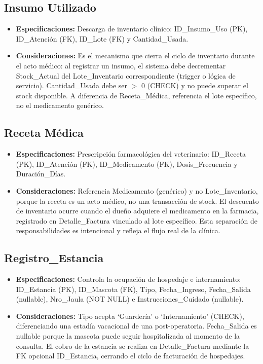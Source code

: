 \subsection{Insumo Utilizado}

\begin{itemize}
	\item \textbf{Especificaciones:} Descarga de inventario clínico: ID\_Insumo\_Uso (PK), ID\_Atención (FK), ID\_Lote (FK) y Cantidad\_Usada.
	\item \textbf{Consideraciones:} Es el mecanismo que cierra el ciclo de inventario durante el acto médico: al registrar un insumo, el sistema debe decrementar Stock\_Actual del Lote\_Inventario correspondiente (trigger o lógica de servicio). Cantidad\_Usada debe ser $>$ 0 (CHECK) y no puede superar el stock disponible. A diferencia de Receta\_Médica, referencia el lote específico, no el medicamento genérico.
\end{itemize}

\subsection{Receta Médica}

\begin{itemize}
	\item \textbf{Especificaciones:} Prescripción farmacológica del veterinario: ID\_Receta (PK), ID\_Atención (FK), ID\_Medicamento (FK), Dosis\_Frecuencia y Duración\_Días.
	\item \textbf{Consideraciones:} Referencia Medicamento (genérico) y no Lote\_Inventario, porque la receta es un acto médico, no una transacción de stock. El descuento de inventario ocurre cuando el dueño adquiere el medicamento en la farmacia, registrado en Detalle\_Factura vinculado al lote específico. Esta separación de responsabilidades es intencional y refleja el flujo real de la clínica.
\end{itemize}

\subsection{Registro\_Estancia}

\begin{itemize}
	\item \textbf{Especificaciones:} Controla la ocupación de hospedaje e internamiento: ID\_Estancia (PK), ID\_Mascota (FK), Tipo, Fecha\_Ingreso, Fecha\_Salida (nullable), Nro\_Jaula (NOT NULL) e Instrucciones\_Cuidado (nullable).
	\item \textbf{Consideraciones:} Tipo acepta `Guardería' o `Internamiento' (CHECK), diferenciando una estadía vacacional de una post-operatoria. Fecha\_Salida es nullable porque la mascota puede seguir hospitalizada al momento de la consulta. El cobro de la estancia se realiza en Detalle\_Factura mediante la FK opcional ID\_Estancia, cerrando el ciclo de facturación de hospedajes.
\end{itemize}

